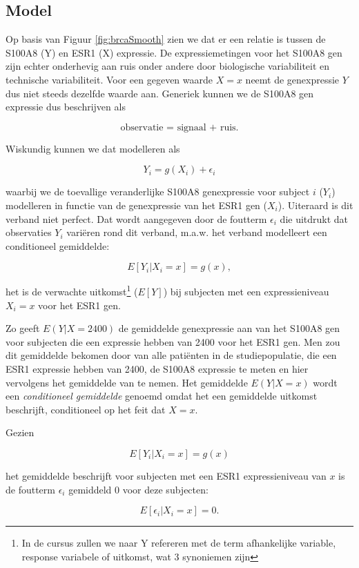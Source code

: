 \documentclass[
  12pt,dutch,coursenotes]{book}
\theoremstyle{definition}
\theoremstyle{definition}
\theoremstyle{definition}
\theoremstyle{remark}
\begin{document}
\hypertarget{model}{%
\subsection{Model}\label{model}}

Op basis van Figuur \ref{fig:brcaSmooth} zien we dat er een relatie is tussen de S100A8 (Y) en ESR1 (X) expressie.
De expressiemetingen voor het S100A8 gen zijn echter onderhevig aan ruis onder andere door biologische variabiliteit en technische variabiliteit.
Voor een gegeven waarde \(X=x\) neemt de genexpressie \(Y\) dus niet steeds dezelfde waarde aan.
Generiek kunnen we de S100A8 gen expressie dus beschrijven als

\[\text{observatie = signaal + ruis.}\]

Wiskundig kunnen we dat modelleren als

\[Y_i=g(X_i)+\epsilon_i\]

waarbij we de toevallige veranderlijke S100A8 genexpressie voor subject \(i\) (\(Y_i\)) modelleren in functie van de genexpressie van het ESR1 gen (\(X_i\)). Uiteraard is dit verband niet perfect. Dat wordt aangegeven door de foutterm \(\epsilon_i\) die uitdrukt dat observaties \(Y_i\) variëren rond dit verband, m.a.w.
het verband modelleert een conditioneel gemiddelde:

\[E[Y_i|X_i=x]=g(x),\]

het is de verwachte uitkomst\footnote{In de cursus zullen we naar Y refereren met de term afhankelijke variable, response variabele of uitkomst, wat 3 synoniemen zijn} (\(E[Y]\)) bij subjecten met een expressieniveau \(X_i=x\) voor het ESR1 gen.

Zo geeft \(E(Y|X=2400)\) de gemiddelde genexpressie aan van het S100A8 gen voor subjecten die een expressie hebben van 2400 voor het ESR1 gen.
Men zou dit gemiddelde bekomen door van alle patiënten in de studiepopulatie, die een ESR1 expressie hebben van 2400, de S100A8 expressie te meten en hier vervolgens het gemiddelde van te nemen.
Het gemiddelde \(E(Y|X=x)\) wordt
een \emph{conditioneel gemiddelde} genoemd omdat het een gemiddelde
uitkomst beschrijft, conditioneel op het feit dat \(X=x\).

Gezien

\[E[Y_i|X_i=x]=g(x)\]

het gemiddelde beschrijft voor subjecten met een ESR1 expressieniveau van \(x\) is de foutterm \(\epsilon_i\) gemiddeld 0 voor deze subjecten:

\[E[\epsilon_i\vert X_i=x]=0.\]
\end{document}
